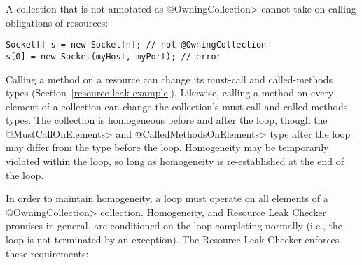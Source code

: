 A collection that is not annotated as \<@OwningCollection> cannot take on
calling obligations of resources:

\begin{verbatim}
Socket[] s = new Socket[n]; // not @OwningCollection
s[0] = new Socket(myHost, myPort); // error
\end{verbatim}



Calling a method on a resource can change its must-call and called-methods
types (Section~\ref{resource-leak-example}).  Likewise, calling a method on
every element of a collection can change the collection's must-call and
called-methods types.  The collection is homogeneous before and after the
loop, though the \<@MustCallOnElements> and \<@CalledMethodsOnElements>
type after the loop may differ from the type before the loop.  Homogeneity
may be temporarily violated within the loop, so long as homogeneity is
re-established at the end of the loop.

In order to maintain homogeneity, a loop must operate on all elements of a
\<@OwningCollection> collection.
Homogeneity, and Resource Leak Checker promises in general, are conditioned
on the loop completing normally (i.e., the loop is not terminated by an exception).
The Resource Leak Checker enforces these requirements:

